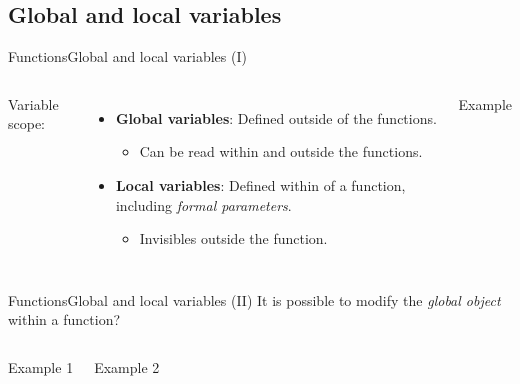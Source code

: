 \documentclass[10pt,compress]{beamer} %
\begin{document}
\subsection{Global and local variables}
\begin{frame}{Functions}{Global and local variables (I)}
\begin{columns}
	Variable scope:
		\begin{itemize}
		\item \small \textbf{Global variables}: Defined outside of the functions. 
		\begin{itemize}
		\item Can be read  within and outside the functions.
		\end{itemize}
		\item \small \textbf{Local variables}: Defined within of a function, including \textit{formal parameters}.
		\begin{itemize}
		\item Invisibles outside the function.
		\end{itemize}
		\end{itemize}
		\vspace{-0.2cm}
   
		\begin{block}{Example}
		\vspace{-0.2cm}
		
		\vspace{-0.2cm}
		\end{block}
	\end{columns}
\end{frame}


\begin{frame}{Functions}{Global and local variables (II)}
It is possible to modify the \textit{global object} within a function?
    \begin{columns}
		\begin{block}{Example 1}
		\vspace{-0.2cm}
		
		\vspace{-0.2cm}
		\end{block}
	
		\begin{block}{Example 2}
		\vspace{-0.2cm}
		
		\vspace{-0.2cm}
		\end{block}
	\end{columns}
\end{frame}
\end{document}
